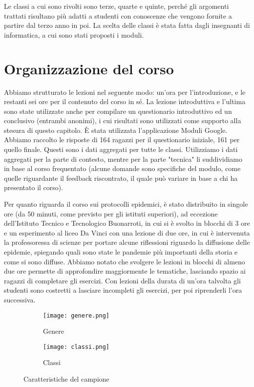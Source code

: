Le classi a cui sono rivolti sono terze, quarte e quinte, perché gli argomenti trattati risultano più adatti a studenti con conoscenze che vengono fornite a partire dal terzo anno in poi. La scelta delle classi è stata fatta dagli insegnanti di informatica, a cui sono stati proposti i moduli.


\section{Organizzazione del corso}
Abbiamo strutturato le lezioni nel seguente modo: un’ora per l’introduzione, e le restanti sei ore per il contenuto del corso in sé. La lezione introduttiva e l’ultima sono state utilizzate anche per compilare un questionario introduttivo ed un conclusivo (entrambi anonimi), i cui risultati sono utilizzati come supporto alla stesura di questo capitolo. È stata utilizzata l’applicazione Moduli Google. Abbiamo raccolto le risposte di 164 ragazzi per il questionario iniziale, 161 per quello finale. Questi sono i dati aggregati per tutte le classi. Utilizziamo i dati aggregati per la parte  di contesto, mentre per la parte "tecnica" li suddividiamo in base al corso frequentato (alcune domande sono specifiche del modulo, come quelle riguardante il feedback riscontrato, il quale può variare in base a chi ha presentato il corso). 

Per quanto riguarda il corso sui protocolli epidemici, è stato distribuito in singole ore (da 50 minuti, come previsto per gli istituti superiori), ad eccezione dell'Istituto Tecnico e Tecnologico Buonarroti, in cui si è svolto in blocchi di 3 ore e un esperimento al liceo Da Vinci con una lezione di due ore, in cui è intervenuta la professoressa di scienze per portare alcune riflessioni riguardo la diffusione delle epidemie, spiegando quali sono state le pandemie più importanti della storia e come si sono diffuse. Abbiamo notato che svolgere le lezioni in blocchi di almeno due ore permette di approfondire maggiormente le tematiche, lasciando spazio ai ragazzi di completare gli esercizi. Con lezioni della durata di un'ora talvolta gli studenti sono costretti a lasciare incompleti gli esercizi, per poi riprenderli l'ora successiva. 

\begin{figure}[!ht]
    \begin{subfigure}{.5\textwidth}
        \centering
        \texttt{[image: genere.png]}
        \caption{Genere}
        \label{fig:genere}
    \end{subfigure}\hfill
    \begin{subfigure}{.5\textwidth}
        \centering
        \texttt{[image: classi.png]}
        \caption{Classi}
        \label{fig:classi}
    \end{subfigure}
    \caption{Caratteristiche del campione} 
\end{figure}
